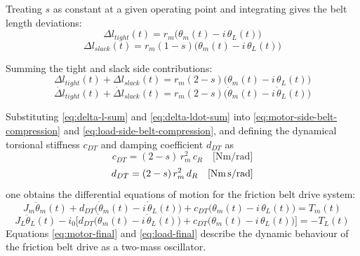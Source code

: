 Treating $s$ as constant at a given operating point and integrating gives the belt length deviations:
\begin{equation}
	\Delta l_{tight}(t) = r_m\bigl(\theta_m(t) - i\,\theta_L(t)\bigr)
	\label{eq:delta-l-tight}
\end{equation}
\begin{equation}
	\Delta l_{slack}(t) = r_m(1-s)\bigl(\theta_m(t) - i\,\theta_L(t)\bigr)
	\label{eq:delta-l-slack}
\end{equation}

Summing the tight and slack side contributions:
\begin{equation}
	\Delta l_{tight}(t) + \Delta l_{slack}(t) = r_m(2-s)\bigl(\theta_m(t) - i\,\theta_L(t)\bigr)
	\label{eq:delta-l-sum}
\end{equation}
\begin{equation}
	\dot{\Delta l}_{tight}(t) + \dot{\Delta l}_{slack}(t) = r_m(2-s)\bigl(\dot{\theta}_m(t) - i\,\dot{\theta}_L(t)\bigr)
	\label{eq:delta-ldot-sum}
\end{equation}

Substituting \autoref{eq:delta-l-sum} and \autoref{eq:delta-ldot-sum} into \autoref{eq:motor-side-belt-compression} and \autoref{eq:load-side-belt-compression}, and defining the dynamical torsional stiffness $c_{DT}$ and damping coefficient $d_{DT}$ as
\begin{equation}
	c_{DT} = (2-s)\,r_m^2\,c_R \quad \text{[Nm/rad]}
	\label{eq:c-dt}
\end{equation}
\begin{equation}
	d_{DT} = (2-s)\,r_m^2\,d_R \quad \text{[Nm\,s/rad]}
	\label{eq:d-dt}
\end{equation}
one obtains the differential equations of motion for the friction belt drive system:
\begin{equation}
	J_m\ddot{\theta}_m(t) + d_{DT}\bigl(\dot{\theta}_m(t) - i\,\dot{\theta}_L(t)\bigr) + c_{DT}\bigl(\theta_m(t) - i\,\theta_L(t)\bigr) = T_m(t)
	\label{eq:motor-final}
\end{equation}
\begin{equation}
	J_L\ddot{\theta}_L(t) - i_0\bigl[d_{DT}\bigl(\dot{\theta}_m(t) - i\,\dot{\theta}_L(t)\bigr) + c_{DT}\bigl(\theta_m(t) - i\,\theta_L(t)\bigr)\bigr] = -T_L(t)
	\label{eq:load-final}
\end{equation}
Equations \autoref{eq:motor-final} and \autoref{eq:load-final} describe the dynamic behaviour of the friction belt drive as a two-mass oscillator.


